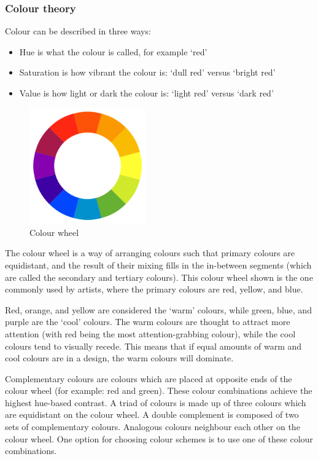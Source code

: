 \documentclass[letterpaper]{article}
\begin{document}
\subsubsection{Colour theory}
Colour can be described in three ways:
\begin{itemize}
\item Hue is what the colour is called, for example `red'
\item Saturation is how vibrant the colour is: `dull red' versus `bright red'
\item Value is how light or dark the colour is: `light red' versus `dark red'
\end{itemize}

\begin{figure}[!ht]
  \begin{center}
     \includegraphics[width=50mm]{Figures/colour_wheel.png}
     \caption{Colour wheel}
  \end{center}
\end{figure}

The colour wheel is a way of arranging colours such that primary colours are equidistant, and the result of their mixing fills in the in-between segments (which are called the secondary and tertiary colours). This colour wheel shown is the one commonly used by artists, where the primary colours are red, yellow, and blue. 

Red, orange, and yellow are considered the `warm' colours, while green, blue, and purple are the `cool' colours. The warm colours are thought to attract more attention (with red being the most attention-grabbing colour), while the cool colours tend to visually recede. This means that if equal amounts of warm and cool colours are in a design, the warm colours will dominate. 

Complementary colours are colours which are placed at opposite ends of the colour wheel (for example: red and green). These colour combinations achieve the highest hue-based contrast. A triad of colours is made up of three colours which are equidistant on the colour wheel. A double complement is composed of two sets of complementary colours. Analogous colours neighbour each other on the colour wheel. One option for choosing colour schemes is to use one of these colour combinations.
\end{document}
